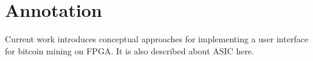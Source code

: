 \clearpage\vspace*{\fill}
\section*{Annotation}

Current work introduces conceptual approaches for implementing a user interface
for bitcoin mining on FPGA. It is also described about ASIC here.


\vspace{\fill}
\clearpage
